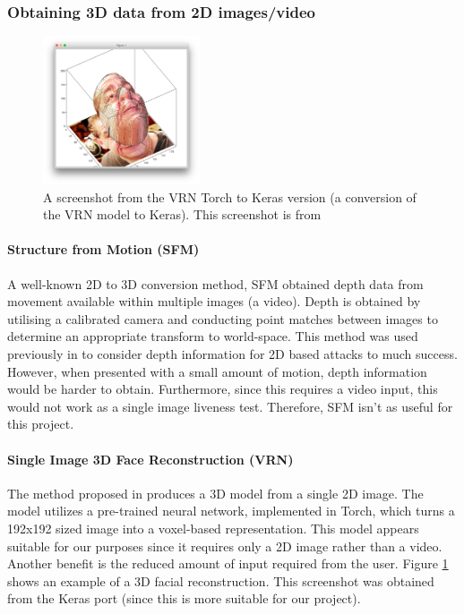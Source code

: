 \documentclass[10pt,a4paper]{article}
\begin{document}
        \cite{3DMadDataset}

        \subsubsection{Obtaining 3D data from 2D images/video}
            \begin{figure}
                \centering
                \includegraphics[width=175px]{3DReconstructionFromSource}
                \caption{A screenshot from the VRN Torch to Keras version (a conversion of the VRN model to Keras). This screenshot is from \cite{VRNTorchToKeras}}
                \label{3DReconstructionScreenshot}
            \end{figure}
            \paragraph{Structure from Motion (SFM)}
            A well-known 2D to 3D conversion method, SFM obtained depth data from movement available within multiple images (a video). Depth is obtained by utilising a calibrated camera and conducting point matches between images
            to determine an appropriate transform to world-space. This method was used previously in \cite{SFMClassifier} to consider depth information for 2D based attacks to much success.
            However, when presented with a small amount of motion, depth information would be harder to obtain. Furthermore, since this requires a video input, this would not work as a single image liveness test. Therefore, SFM isn't as useful for this project.

            \paragraph{Single Image 3D Face Reconstruction (VRN)}
            The method proposed in \cite{3DReconstructionMethod} produces a 3D model from a single 2D image. The model utilizes a pre-trained neural network, implemented in Torch, which turns a 192x192 sized image into a voxel-based representation.
            This model appears suitable for our purposes since it requires only a 2D image rather than a video. Another benefit is the reduced amount of input required from the user. Figure \ref{3DReconstructionScreenshot} shows an example of a 3D facial reconstruction. 
            This screenshot was obtained from the Keras port (since this is more suitable for our project).
\end{document}
